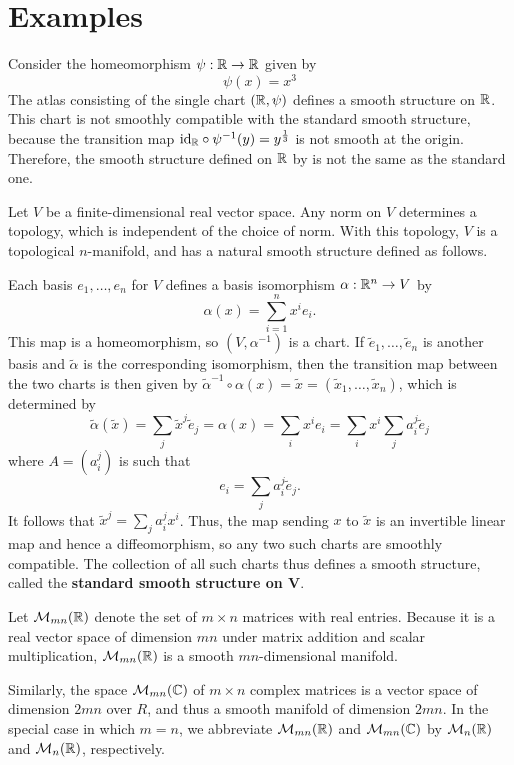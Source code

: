 \section{Examples}
\begin{example}\label{smooth structure eg}
Consider the homeomorphism $\psi:\mathbb{R}\to\mathbb{R}$ given by
\[\psi(x)=x^3\]
The atlas consisting of the single chart $(\mathbb{R},\psi)$ defines a smooth structure on $\mathbb{R}$. This chart is not smoothly compatible with the standard smooth structure, because the transition map $\mathrm{id}_{\mathbb{R}}\circ\psi^{-1}(y)=y^{\frac{1}{3}}$ is not smooth at the origin. Therefore, the smooth structure defined on $\mathbb{R}$ by is not the same as the standard one.
\end{example}
\begin{example}\label{mani vector space}
Let $V$ be a finite-dimensional real vector space. Any norm on $V$ determines a topology, which is independent of the choice of norm. With this topology, $V$ is a topological $n$-manifold, and has a natural smooth structure defined as follows.\par 
Each basis $e_1,\dots,e_n$ for $V$ defines a basis isomorphism $\alpha:\mathbb{R}^n\to V$ by
\[\alpha(x)=\sum_{i=1}^{n}x^ie_i.\]
This map is a homeomorphism, so $(V,\alpha^{-1})$ is a chart. If $\widetilde{e}_1,\dots,\widetilde{e}_n$ is another basis and $\tilde{\alpha}$ is the corresponding isomorphism, then the transition map between the two charts is then given by $\tilde{\alpha}^{-1}\circ\alpha(x)=\widetilde{x}=(\widetilde{x}_1,\dots,\widetilde{x}_n)$, which is determined by 
\[\tilde{\alpha}(\widetilde{x})=\sum_j\widetilde{x}^j\widetilde{e}_j=\alpha(x)=\sum_ix^ie_i=\sum_ix^i\sum_ja^j_i\widetilde{e}_j\]
where $A=(a_i^j)$ is such that
\[e_i=\sum_ja_i^j\widetilde{e}_j.\]
It follows that $\widetilde{x}^j=\sum_ja_i^jx^i$. Thus, the map sending $x$ to $\widetilde{x}$ is an invertible linear map and hence a diffeomorphism, so any two such charts are smoothly compatible. The collection of all such charts thus defines a smooth structure, called the \textbf{standard smooth structure on $\bm{V}$}.
\end{example}
\begin{example}
Let $\mathcal{M}_{mn}(\mathbb{R})$ denote the set of $m\times n$ matrices with real entries. Because it is a real vector space of dimension $mn$ under
matrix addition and scalar multiplication, $\mathcal{M}_{mn}(\mathbb{R})$ is a smooth $mn$-dimensional manifold.\par
Similarly, the space $\mathcal{M}_{mn}(\mathbb{C})$ of $m\times n$ complex matrices is a vector space of dimension $2mn$ over $R$, and thus a smooth manifold of dimension $2mn$. In the special case in which $m=n$, we abbreviate $\mathcal{M}_{mn}(\mathbb{R})$ and $\mathcal{M}_{mn}(\mathbb{C})$ by $\mathcal{M}_{n}(\mathbb{R})$ and $\mathcal{M}_{n}(\mathbb{R})$, respectively.
\end{example}
